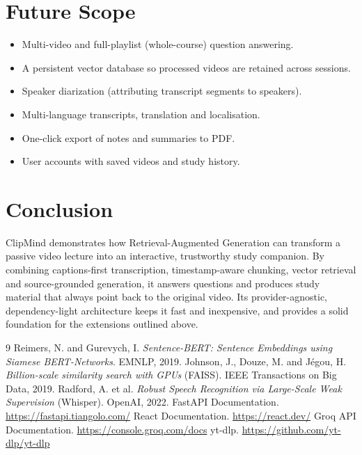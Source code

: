 \documentclass[11pt,a4paper]{article}
\begin{document}
\section{Future Scope}
\begin{itemize}[leftmargin=1.4em]
  \item Multi-video and full-playlist (whole-course) question answering.
  \item A persistent vector database so processed videos are retained across sessions.
  \item Speaker diarization (attributing transcript segments to speakers).
  \item Multi-language transcripts, translation and localisation.
  \item One-click export of notes and summaries to PDF.
  \item User accounts with saved videos and study history.
\end{itemize}

\section{Conclusion}
ClipMind demonstrates how Retrieval-Augmented Generation can transform a passive video
lecture into an interactive, trustworthy study companion. By combining captions-first
transcription, timestamp-aware chunking, vector retrieval and source-grounded generation,
it answers questions and produces study material that always point back to the original
video. Its provider-agnostic, dependency-light architecture keeps it fast and inexpensive,
and provides a solid foundation for the extensions outlined above.

\begin{thebibliography}{9}
 Reimers, N. and Gurevych, I. \textit{Sentence-BERT: Sentence Embeddings
  using Siamese BERT-Networks}. EMNLP, 2019.
 Johnson, J., Douze, M. and J\'egou, H. \textit{Billion-scale similarity
  search with GPUs} (FAISS). IEEE Transactions on Big Data, 2019.
 Radford, A. et al. \textit{Robust Speech Recognition via Large-Scale
  Weak Supervision} (Whisper). OpenAI, 2022.
 FastAPI Documentation. \url{https://fastapi.tiangolo.com/}
 React Documentation. \url{https://react.dev/}
 Groq API Documentation. \url{https://console.groq.com/docs}
 yt-dlp. \url{https://github.com/yt-dlp/yt-dlp}
\end{thebibliography}
\end{document}
